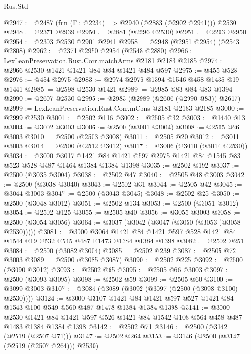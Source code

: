 \begin{lexlean}{RustStd}
\begin{coremodule}
@2947 := @2487 (fun (Γ : @2234) => @2940 (@2883 (@2902 @2941))) @2530
@2948 := @2371 @2939
@2950 := @2881 (@2296 @2530)
@2951 := @2203 @2950
@2954 := @2303 @2530 @2901 @2941
@2958 := @2948 (@2951 @2954) (@2543 @2808)
@2962 := @2371 @2950 @2954 (@2548 @2880)
@2966 := LexLeanPreservation.Rust.Corr.matchArms @2181 @2183 @2185
@2974 := @2966 @2530 @1421 @1421 @84 @84 @1421 @484 @597
@2975 := @455 @528
@2976 := @454 @2975
@2983 := @2974 @2976 @1394 @1546 @458 @1435 @19 @1441
@2985 := @2598 @2530 @1421
@2989 := @2985 @83 @84 @83 @1394
@2990 := @2607 @2530
@2995 := @2983 (@2989 (@2606 (@2990 @83)) @2617)
@2999 := LexLeanPreservation.Rust.Corr.mCons @2181 @2183 @2185
@3000 := @2999 @2530
@3001 := @2502 @116
@3002 := @2505 @32
@3003 := @1440 @13
@3004 := @3002 @3003
@3006 := @2500 (@3001 @3004)
@3008 := @2505 @26 @3003
@3010 := @2500 (@2503 @3008)
@3011 := @2505 @20
@3012 := @3011 @3003
@3014 := @2500 (@2512 @3012)
@3017 := @3006 (@3010 (@3014 @2530))
@3034 := @3000
    @3017
    @1421
    @84
    @1421
    @597
    @2975
    @1421
    @84
    @1545
    @83
    @523
    @528
    @487
    @1464
    @1384
    @1384
    @1398
@3035 := @2502 @192
@3037 := @2500 (@3035 @3004)
@3038 := @2502 @47
@3040 := @2505 @48 @3003
@3042 := @2500 (@3038 @3040)
@3043 := @2502 @31
@3044 := @2505 @42
@3045 := @3044 @3003
@3047 := @2500 (@3043 @3045)
@3048 := @2502 @25
@3050 := @2500 (@3048 @3012)
@3051 := @2502 @134
@3053 := @2500 (@3051 @3012)
@3054 := @2502 @125
@3055 := @2505 @40
@3056 := @3055 @3003
@3058 := @2500 (@3054 @3056)
@3064 := @3037 (@3042 (@3047 (@3050 (@3053 (@3058 @2530)))))
@3081 := @3000
    @3064
    @1421
    @84
    @1421
    @597
    @528
    @1421
    @84
    @1544
    @19
    @532
    @545
    @487
    @1473
    @1384
    @1384
    @1398
@3082 := @2502 @251
@3084 := @2500 (@3082 @3004)
@3085 := @2502 @239
@3087 := @2505 @72 @3003
@3089 := @2500 (@3085 @3087)
@3090 := @2502 @225
@3092 := @2500 (@3090 @3012)
@3093 := @2502 @65
@3095 := @2505 @66 @3003
@3097 := @2500 (@3093 @3095)
@3098 := @2502 @59
@3099 := @2505 @60
@3100 := @3099 @3003
@3107 := @3084 (@3089 (@3092 (@3097 (@2500 (@3098 @3100) @2530))))
@3124 := @3000
    @3107
    @1421
    @84
    @1421
    @597
    @527
    @1421
    @84
    @1543
    @100
    @549
    @560
    @487
    @1478
    @1384
    @1384
    @1398
@3141 := @3000
    @2530
    @1421
    @84
    @1421
    @597
    @526
    @1421
    @84
    @1542
    @108
    @564
    @458
    @487
    @1483
    @1384
    @1384
    @1398
@3142 := @2502 @71
@3146 := @2500 (@3142 (@2519 (@2507 @71)))
@3147 := @2502 @264
@3153 := @3146 (@2500 (@3147 (@2519 (@2507 @264))) @2530)

\end{coremodule}
\end{lexlean}
